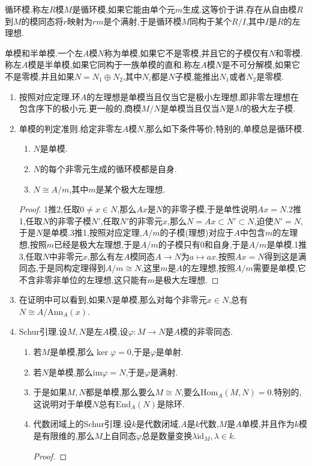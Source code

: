 循环模.称左$R$模$M$是循环模,如果它能由单个元$m$生成.这等价于讲,存在从自由模$R$到$M$的模同态将$r$映射为$rm$是个满射,于是循环模$M$同构于某个$R/I$,其中$I$是$R$的左理想.

单模和半单模.一个左$A$模$N$称为单模,如果它不是零模,并且它的子模仅有$N$和零模.称左$A$模是半单模,如果它同构于一族单模的直和.称左$A$模$N$是不可分解模,如果它不是零模,并且如果$N=N_1\oplus N_2$,其中$N_i$都是$N$子模,能推出$N_1$或者$N_2$是零模.
\begin{enumerate}
	\item 按照对应定理,环$A$的左理想是单模当且仅当它是极小左理想,即非零左理想在包含序下的极小元.更一般的,商模$M/N$是单模当且仅当$N$是$M$的极大左子模.
	\item 单模的判定准则.给定非零左$A$模$N$,那么如下条件等价,特别的,单模总是循环模.
	\begin{enumerate}
		\item $N$是单模.
		\item $N$的每个非零元生成的循环模都是自身.
		\item $N\cong A/m$,其中$m$是某个极大左理想.
	\end{enumerate}
	\begin{proof}
		
		1推2,任取$0\not=x\in N$,那么$Ax$是$N$的非零子模,于是单性说明$Ax=N$.2推1,任取$N$的非零子模$N'$,任取$N'$的非零元$x$,那么$N=Ax\subset N'\subset N$,迫使$N'=N$,于是$N$是单模.3推1,按照对应定理,$A/m$的子模(理想)对应于$A$中包含$m$的左理想,按照$m$已经是极大左理想,于是$A/m$的子模只有0和自身,于是$A/m$是单模.1推3,任取$N$中非零元$x$,那么有左$A$模同态$A\to N$为$a\mapsto ax$.按照$Ax=N$得到这是满同态,于是同构定理得到$A/m\cong N$,这里$m$是$A$的左理想,按照$A/m$需要是单模,它不含非零非单位的左理想,这只能有$m$是极大左理想.
	\end{proof}
	\item 在证明中可以看到,如果$N$是单模,那么对每个非零元$x\in N$,总有$N\cong A/\mathrm{Ann}_A(x)$.
	\item Schur引理.设$M,N$是左$A$模,设$\varphi:M\to N$是$A$模的非零同态.
	\begin{enumerate}
		\item 若$M$是单模,那么$\ker\varphi=0$,于是$\varphi$是单射.
		\item 若$N$是单模,那么$\mathrm{im}\varphi=N$,于是$\varphi$是满射.
		\item 于是如果$M,N$都是单模,那么要么$M\cong N$,要么$\mathrm{Hom}_A(M,N)=0$.特别的,这说明对于单模$N$总有$\mathrm{End}_A(N)$是除环.
		\item 代数闭域上的Schur引理.设$k$是代数闭域,$A$是$k$代数,$M$是$A$单模,并且作为$k$模是有限维的,那么$M$上自同态$\varphi$总是数量变换$\lambda\mathrm{id}_M,\lambda\in k$.
		\begin{proof}
			

\end{proof}
\end{enumerate}
\end{enumerate}
